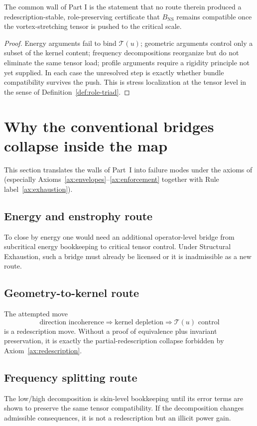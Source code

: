 \begin{proposition}\label{prop:wall-bundle}
The common wall of Part I is the statement that no route therein produced a redescription-stable,
role-preserving certificate that $B_{\mathrm{NS}}$ remains compatible once the vortex-stretching tensor is
pushed to the critical scale.
\end{proposition}

\begin{proof}
Energy arguments fail to bind $\mathcal T(u)$; geometric arguments control only a subset of the kernel
content; frequency decompositions reorganize but do not eliminate the same tensor load; profile
arguments require a rigidity principle not yet supplied. In each case the unresolved step is exactly
whether bundle compatibility survives the push. This is stress localization at the tensor level in the
sense of Definition~\ref{def:role-triad}.
\end{proof}

\section{Why the conventional bridges collapse inside the map}
This section translates the walls of Part~I into failure modes under the axioms of
 (especially Axioms~\ref{ax:envelopes}--\ref{ax:enforcement} together with Rule label~\ref{ax:exhaustion}).

\subsection{Energy and enstrophy route}
To close by energy one would need an additional operator-level bridge from subcritical energy
bookkeeping to critical tensor control. Under Structural Exhaustion, such a bridge must already be
licensed or it is inadmissible as a new route. 

\subsection{Geometry-to-kernel route}
The attempted move
\[
\text{direction incoherence} \Longrightarrow \text{kernel depletion} \Longrightarrow \mathcal T(u)
\text{ control}
\]
is a redescription move. Without a proof of equivalence plus invariant preservation, it is exactly the
partial-redescription collapse forbidden by Axiom~\ref{ax:redescription}.


\subsection{Frequency splitting route}
The low/high decomposition is skin-level bookkeeping until its error terms are shown to preserve the
same tensor compatibility. If the decomposition changes admissible consequences, it is not a
redescription but an illicit power gain. 

